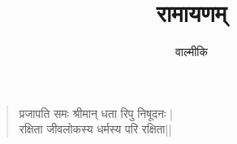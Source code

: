 \documentclass[a4paper,12pt]{article}
\begin{document}
 
\title{रामायणम्}
\author{वाल्मीकि}

\maketitle

\cfoot{\thepage}
\rfoot{}
\renewcommand{\headrulewidth}{0.4pt}
\renewcommand{\footrulewidth}{0.4pt}

\begin{verse}
प्रजापति समः श्रीमान् धता रिपु निषूदनः | \\
रक्षिता जीवलोकस्य धर्मस्य परि रक्षिता||
\end{verse}
\end{document}

